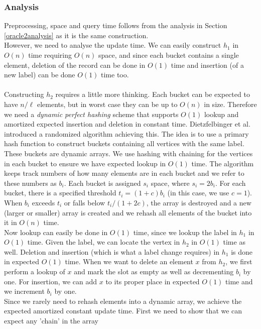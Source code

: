 \subsubsection{Analysis}
Preprocessing, space and query time follows from the analysis in Section
\ref{oracle2analysis} as it is the same construction. \\
However, we need to analyse the update time. We can easily construct $h_1$ in $O(n)$ time
requiring $O(n)$ space, and since each bucket contains a single element, deletion of the
record  can be done in $O(1)$ time and insertion (of a new label) can be done $O(1)$ time
too. \\
\\
Constructing $h_2$ requires a little more thinking. Each bucket can be expected to
have $n/\ell$ elements, but in worst case they can be up to $O(n)$ in size. Therefore we
need a \textit{dynamic perfect hashing} scheme that supports $O(1)$ lookup and
amortized expected insertion and deletion in constant time. Dietzfelbinger et al.
\cite{dietzfelbinger1994dynamic} introduced a randomized algorithm achieving this. The idea is to use a
primary hash function to construct buckets containing all vertices with the same label.
These buckets are dynamic arrays. We use hashing with chaining for the vertices in each bucket to ensure we have expected lookup in $O(1)$ time. The algorithm keeps track numbers of how many elements are in
each bucket and we refer to these numbers as $b_i$. Each bucket is assigned $s_i$ space,
where $s_i=2b_i$. For each bucket, there is a specified threshold $t_i=(1+c)b_i$ (in this
case, we use $c=1$). When $b_i$ exceeds $t_i$ or falls below
$t_i/(1+2c)$, the array is destroyed and a new (larger or smaller) array is created and
we rehash all elements of the bucket into it in $O(n)$ time. \\
Now lookup can easily be done in $O(1)$ time, since we lookup the label in $h_1$ in
$O(1)$ time. Given the label, we can locate the vertex in $h_2$ in $O(1)$ time as well.
Deletion and insertion (which is what a label change requires) in $h_1$ is done in
expected $O(1)$
time. When we want to delete an element $x$ from $h_2$, we first perform a lookup of $x$
and mark the slot as empty as well as decrementing $b_i$ by one. For insertion, we can
add $x$ to its proper place in expected $O(1)$ time and we increment $b_i$ by one. \\
Since we rarely need to rehash elements into a dynamic array, we achieve the expected amortized
constant update time. First we need to show that we can expect any 'chain' in the array
